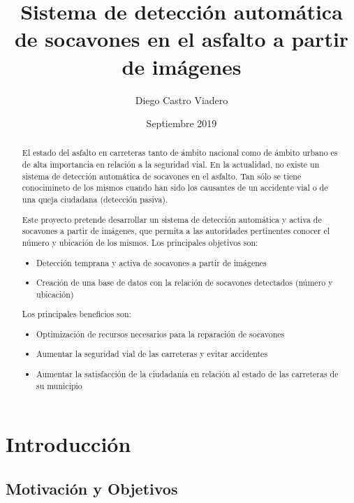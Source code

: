 \documentclass[]{article}
\title{Sistema de detección automática de socavones en el asfalto a partir de imágenes}
\author{Diego Castro Viadero}
\date{Septiembre 2019}
\begin{document}
\maketitle

\begin{abstract}
El estado del asfalto en carreteras tanto de ámbito nacional como de ámbito urbano es de alta importancia en relación a la seguridad vial. En la actualidad, no existe un sistema de detección automática de socavones en el asfalto. Tan sólo se tiene conocimineto de los mismos cuando han sido los causantes de un accidente vial o de una queja ciudadana (detección pasiva).

Este proyecto pretende desarrollar un sistema de detección automática y activa de socavones a partir de imágenes, que permita a las autoridades pertinentes conocer el número y ubicación de los mismos. Los principales objetivos son:

\begin{itemize}
	\item Detección temprana y activa de socavones a partir de imágenes
	\item Creación de una base de datos con la relación de socavones detectados (número y ubicación)
\end{itemize}

Los principales beneficios son:

\begin{itemize}
	\item Optimización de recursos necesarios para la reparación de socavones
	\item Aumentar la seguridad vial de las carreteras y evitar accidentes
	\item Aumentar la satisfacción de la ciudadanía en relación al estado de las carreteras de su municipio
\end{itemize}
\end{abstract}

\newpage
\tableofcontents{}


\newpage
\section{Introducción}


\subsection{Motivación y Objetivos}
\end{document}
